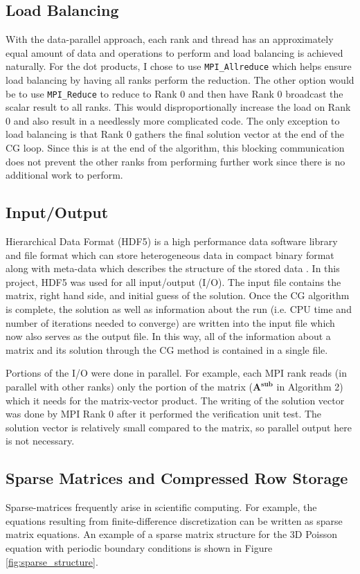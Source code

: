 \documentclass{article}
\begin{document}
\subsection{Load Balancing}
With the data-parallel approach, each rank and thread has an approximately equal amount of data and operations to perform and load balancing is achieved naturally. For the dot products, I chose to use \texttt{MPI\_Allreduce} which helps ensure load balancing by having all ranks perform the reduction. The other option would be to use \texttt{MPI\_Reduce} to reduce to Rank 0 and then have Rank 0 broadcast the scalar result to all ranks. This would disproportionally increase the load on Rank 0 and also result in a needlessly more complicated code. The only exception to load balancing is that Rank 0 gathers the final solution vector at the end of the CG loop. Since this is at the end of the algorithm, this blocking communication does not prevent the other ranks from performing further work since there is no additional work to perform. 

\subsection{Input/Output}
Hierarchical Data Format (HDF5) is a high performance data software library and file format which can store heterogeneous data in compact binary format along with meta-data which describes the structure of the stored data \cite{hdf5}. In this project, HDF5 was used for all input/output (I/O). The input file contains the matrix, right hand side, and initial guess of the solution. Once the CG algorithm is complete, the solution as well as information about the run (i.e. CPU time and number of iterations needed to converge) are written into the input file which now also serves as the output file. In this way, all of the information about a matrix and its solution through the CG method is contained in a single file. 

Portions of the I/O were done in parallel. For example, each MPI rank reads (in parallel with other ranks) only the portion of the matrix ($\mathbf{A^{sub}}$ in Algorithm 2) which it needs for the matrix-vector product. The writing of the solution vector was done by MPI Rank 0 after it performed the verification unit test. The solution vector is relatively small compared to the matrix, so parallel output here is not necessary.


\subsection{Sparse Matrices and Compressed Row Storage}
Sparse-matrices frequently arise in scientific computing. For example, the equations resulting from finite-difference discretization can be written as sparse matrix equations. An example of a sparse matrix structure for the 3D Poisson equation with periodic boundary conditions is shown in Figure \ref{fig:sparse_structure}.
\end{document}

